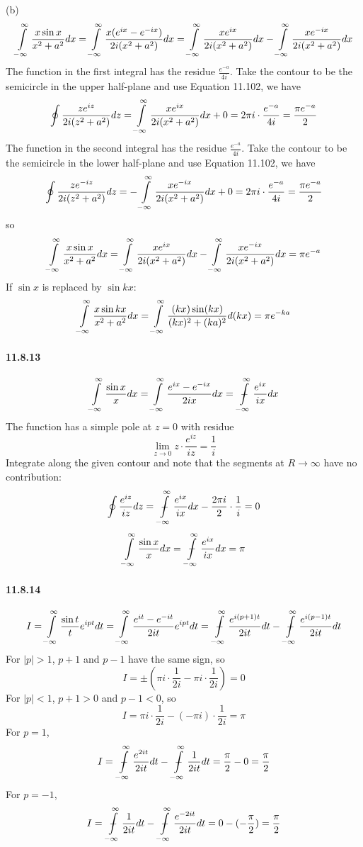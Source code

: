 \documentclass[a4paper]{article}
\begin{document}
(b)
\[
\int\displaylimits_{-\infty}^\infty\frac{x\sin x}{x^2+a^2}dx=\int\displaylimits_{-\infty}^\infty\frac{x(e^{ix}-e^{-ix})}{2i(x^2+a^2)}dx=\int\displaylimits_{-\infty}^\infty\frac{xe^{ix}}{2i(x^2+a^2)}dx-\int\displaylimits_{-\infty}^\infty\frac{xe^{-ix}}{2i(x^2+a^2)}dx
\]
The function in the first integral has the residue $\frac{e^{-a}}{4i}$. Take the contour to be the semicircle in the upper half-plane and use Equation 11.102, we have
\[
\oint\frac{ze^{iz}}{2i(z^2+a^2)}dz=\int\displaylimits_{-\infty}^\infty\frac{xe^{ix}}{2i(x^2+a^2)}dx+0=2\pi i\cdot\frac{e^{-a}}{4i}=\frac{\pi e^{-a}}{2}
\]
The function in the second integral has the residue $\frac{e^{-a}}{4i}$. Take the contour to be the semicircle in the lower half-plane and use Equation 11.102, we have
\[
\oint\frac{ze^{-iz}}{2i(z^2+a^2)}dz=-\int\displaylimits_{-\infty}^\infty\frac{xe^{-ix}}{2i(x^2+a^2)}dx+0=2\pi i\cdot\frac{e^{-a}}{4i}=\frac{\pi e^{-a}}{2}
\]
so
\[
\int\displaylimits_{-\infty}^\infty\frac{x\sin x}{x^2+a^2}dx=\int\displaylimits_{-\infty}^\infty\frac{xe^{ix}}{2i(x^2+a^2)}dx-\int\displaylimits_{-\infty}^\infty\frac{xe^{-ix}}{2i(x^2+a^2)}dx=\pi e^{-a}
\]
If $\sin x$ is replaced by $\sin kx$:
\[
\int\displaylimits_{-\infty}^\infty\frac{x\sin kx}{x^2+a^2}dx=\int\displaylimits_{-\infty}^\infty\frac{(kx)\sin(kx)}{(kx)^2+(ka)^2}d(kx)=\pi e^{-ka}
\]

\paragraph{11.8.13}
\[
\int\displaylimits_{-\infty}^\infty\frac{\sin x}{x}dx=\int\displaylimits_{-\infty}^\infty\frac{e^{ix}-e^{-ix}}{2ix}dx=\ddashint\displaylimits_{-\infty}^\infty\frac{e^{ix}}{ix}dx
\]
The function has a simple pole at $z=0$ with residue
\[
\lim_{z\to0}z\cdot\frac{e^{iz}}{iz}=\frac{1}{i}
\]
Integrate along the given contour and note that the segments at $R\to\infty$ have no contribution:
\[
\oint\frac{e^{iz}}{iz}dz=\ddashint\displaylimits_{-\infty}^\infty\frac{e^{ix}}{ix}dx-\frac{2\pi i}{2}\cdot\frac{1}{i}=0
\]
\[
\int\displaylimits_{-\infty}^\infty\frac{\sin x}{x}dx=\ddashint\displaylimits_{-\infty}^\infty\frac{e^{ix}}{ix}dx=\pi
\]

\paragraph{11.8.14}
\[
I=\int\displaylimits_{-\infty}^\infty\frac{\sin t}{t}e^{ipt}dt=\int\displaylimits_{-\infty}^\infty\frac{e^{it}-e^{-it}}{2it}e^{ipt}dt=\ddashint\displaylimits_{-\infty}^\infty\frac{e^{i(p+1)t}}{2it}dt-\ddashint\displaylimits_{-\infty}^\infty\frac{e^{i(p-1)t}}{2it}dt
\]
For $|p|>1$,\; $p+1$ and $p-1$ have the same sign, so
\[
I=\pm(\pi i\cdot\frac{1}{2i}-\pi i\cdot\frac{1}{2i})=0
\]
For $|p|<1$,\; $p+1>0$ and $p-1<0$, so
\[
I=\pi i\cdot\frac{1}{2i}-(-\pi i)\cdot\frac{1}{2i}=\pi
\]
For $p=1$, 
\[
I=\ddashint\displaylimits_{-\infty}^\infty\frac{e^{2it}}{2it}dt-\ddashint\displaylimits_{-\infty}^\infty\frac{1}{2it}dt=\frac{\pi}{2}-0=\frac{\pi}{2}
\]
For $p=-1$,
\[
I=\ddashint\displaylimits_{-\infty}^\infty\frac{1}{2it}dt-\ddashint\displaylimits_{-\infty}^\infty\frac{e^{-2it}}{2it}dt=0-(-\frac{\pi}{2})=\frac{\pi}{2}
\]
\end{document}
